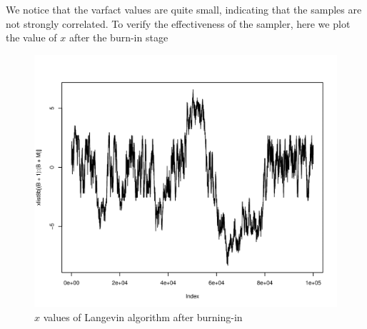 We notice that the varfact values are quite small, indicating that the samples are not strongly correlated. To verify the effectiveness of the sampler, here we plot the value of $x$ after the burn-in stage
\begin{figure}[H]
  \centering
\begin{knitrout}
\color{fgcolor}\begin{kframe}
\begin{alltt}
 \hlkwb{=} 
\hlstd{(xlist8b[(B}\hlopt{+}\hlstd{)}\hlopt{:}\hlopt{+}\hlstd{M)],}\hlstd{=}\hlstd{)}
\end{alltt}
\end{kframe}
\includegraphics[width=\maxwidth]{figure/p8bplot-1} 

\end{knitrout}
		\caption{$x$ values of Langevin algorithm after burning-in}
\end{figure}

